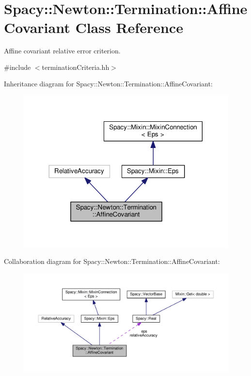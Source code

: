 \hypertarget{classSpacy_1_1Newton_1_1Termination_1_1AffineCovariant}{\section{Spacy\-:\-:Newton\-:\-:Termination\-:\-:Affine\-Covariant Class Reference}
\label{classSpacy_1_1Newton_1_1Termination_1_1AffineCovariant}
}


Affine covariant relative error criterion.  




{\ttfamily \#include $<$termination\-Criteria.\-hh$>$}



Inheritance diagram for Spacy\-:\-:Newton\-:\-:Termination\-:\-:Affine\-Covariant\-:
\nopagebreak
\begin{figure}[H]
\begin{center}
\leavevmode
\includegraphics[width=317pt]{classSpacy_1_1Newton_1_1Termination_1_1AffineCovariant__inherit__graph}
\end{center}
\end{figure}


Collaboration diagram for Spacy\-:\-:Newton\-:\-:Termination\-:\-:Affine\-Covariant\-:
\nopagebreak
\begin{figure}[H]
\begin{center}
\leavevmode
\includegraphics[width=350pt]{classSpacy_1_1Newton_1_1Termination_1_1AffineCovariant__coll__graph}
\end{center}
\end{figure}

